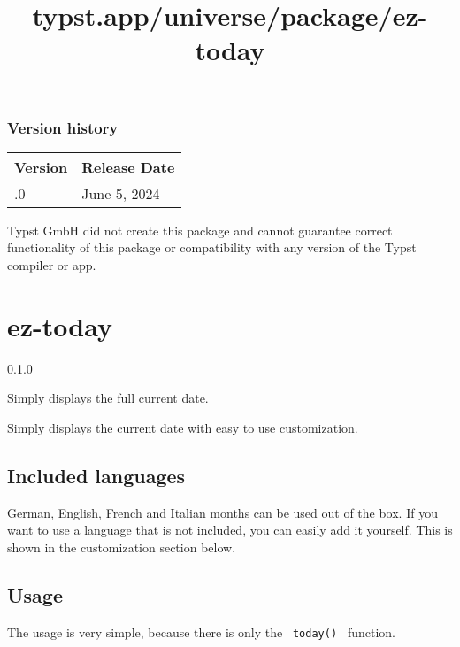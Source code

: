 \label{versions}
\subsubsection{Version history}\label{version-history}

\begin{longtable}[]{@{}ll@{}}
\toprule\noalign{}
Version & Release Date \\
\midrule\noalign{}
\endhead
\bottomrule\noalign{}
\endlastfoot
0.1.0 & June 5, 2024 \\
\end{longtable}

Typst GmbH did not create this package and cannot guarantee correct
functionality of this package or compatibility with any version of the
Typst compiler or app.


\title{typst.app/universe/package/ez-today}

\label{banner}
\section{ez-today}\label{ez-today}

{ 0.1.0 }

Simply displays the full current date.

\label{readme}
Simply displays the current date with easy to use customization.

\subsection{Included languages}\label{included-languages}

German, English, French and Italian months can be used out of the box.
If you want to use a language that is not included, you can easily add
it yourself. This is shown in the customization section below.

\subsection{Usage}\label{usage}

The usage is very simple, because there is only the \texttt{\ today()\ }
function.

\begin{Shaded}
\begin{Highlighting}[]

\end{Highlighting}
\end{Shaded}

